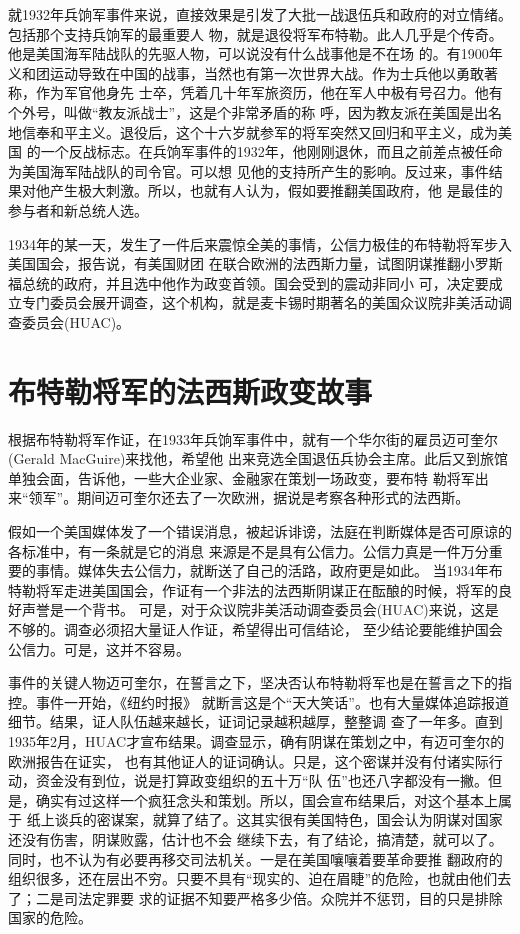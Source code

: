 \documentclass[10pt]{article}
\begin{document}
{就1932年兵饷军事件来说，直接效果是引发了大批一战退伍兵和政府的对立情绪。包括那个支持兵饷军的最重要人
物，就是退役将军布特勒。此人几乎是个传奇。他是美国海军陆战队的先驱人物，可以说没有什么战事他是不在场
的。有1900年义和团运动导致在中国的战事，当然也有第一次世界大战。作为士兵他以勇敢著称，作为军官他身先
士卒，凭着几十年军旅资历，他在军人中极有号召力。他有个外号，叫做``教友派战士''，这是个非常矛盾的称
呼，因为教友派在美国是出名地信奉和平主义。退役后，这个十六岁就参军的将军突然又回归和平主义，成为美国
的一个反战标志。在兵饷军事件的1932年，他刚刚退休，而且之前差点被任命为美国海军陆战队的司令官。可以想
见他的支持所产生的影响。反过来，事件结果对他产生极大刺激。所以，也就有人认为，假如要推翻美国政府，他
是最佳的参与者和新总统人选。

1934年的某一天，发生了一件后来震惊全美的事情，公信力极佳的布特勒将军步入美国国会，报告说，有美国财团
在联合欧洲的法西斯力量，试图阴谋推翻小罗斯福总统的政府，并且选中他作为政变首领。国会受到的震动非同小
可，决定要成立专门委员会展开调查，这个机构，就是麦卡锡时期著名的美国众议院非美活动调查委员会(HUAC)。

\pagebreak
\section{布特勒将军的法西斯政变故事}

根据布特勒将军作证，在1933年兵饷军事件中，就有一个华尔街的雇员迈可奎尔(Gerald MacGuire)来找他，希望他
出来竞选全国退伍兵协会主席。此后又到旅馆单独会面，告诉他，一些大企业家、金融家在策划一场政变，要布特
勒将军出来``领军''。期间迈可奎尔还去了一次欧洲，据说是考察各种形式的法西斯。

假如一个美国媒体发了一个错误消息，被起诉诽谤，法庭在判断媒体是否可原谅的各标准中，有一条就是它的消息
来源是不是具有公信力。公信力真是一件万分重要的事情。媒体失去公信力，就断送了自己的活路，政府更是如此。
当1934年布特勒将军走进美国国会，作证有一个非法的法西斯阴谋正在酝酿的时候，将军的良好声誉是一个背书。
可是，对于众议院非美活动调查委员会(HUAC)来说，这是不够的。调查必须招大量证人作证，希望得出可信结论，
至少结论要能维护国会公信力。可是，这并不容易。

事件的关键人物迈可奎尔，在誓言之下，坚决否认布特勒将军也是在誓言之下的指控。事件一开始，《纽约时报》
就断言这是个``天大笑话''。也有大量媒体追踪报道细节。结果，证人队伍越来越长，证词记录越积越厚，整整调
查了一年多。直到1935年2月，HUAC才宣布结果。调查显示，确有阴谋在策划之中，有迈可奎尔的欧洲报告在证实，
也有其他证人的证词确认。只是，这个密谋并没有付诸实际行动，资金没有到位，说是打算政变组织的五十万``队
伍''也还八字都没有一撇。但是，确实有过这样一个疯狂念头和策划。所以，国会宣布结果后，对这个基本上属于
纸上谈兵的密谋案，就算了结了。这其实很有美国特色，国会认为阴谋对国家还没有伤害，阴谋败露，估计也不会
继续下去，有了结论，搞清楚，就可以了。同时，也不认为有必要再移交司法机关。一是在美国嚷嚷着要革命要推
翻政府的组织很多，还在层出不穷。只要不具有``现实的、迫在眉睫''的危险，也就由他们去了；二是司法定罪要
求的证据不知要严格多少倍。众院并不惩罚，目的只是排除国家的危险。

}
\end{document}
